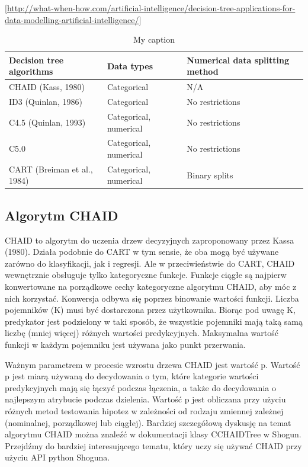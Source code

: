 \documentclass[10pt,a4paper]{article}
\begin{document}
[\url{http://what-when-how.com/artificial-intelligence/decision-tree-applications-for-data-modelling-artificial-intelligence/}]

\begin{table}[]
\centering
\caption{My caption}
\label{my-label}
\begin{tabular}{@{}lll@{}}
\toprule
\textbf{Decision tree algorithms} & \textbf{Data types}    & \textbf{Numerical data splitting method} \\ \midrule
CHAID (Kass, 1980)                & Categorical            & N/A                                      \\ \midrule
ID3 (Quinlan, 1986)               & Categorical            & No restrictions                          \\ \midrule
C4.5 (Quinlan, 1993)              & Categorical, numerical & No restrictions                          \\ \midrule
C5.0 			                  & Categorical, numerical & No restrictions                          \\ \midrule
CART (Breiman et al., 1984)       & Categorical, numerical & Binary splits                            \\ \bottomrule
\end{tabular}
\end{table}

\subsection{Algorytm CHAID}
CHAID to algorytm do uczenia drzew decyzyjnych zaproponowany przez Kassa (1980). Działa podobnie do CART w tym sensie, że oba mogą być używane zarówno do klasyfikacji, jak i regresji. Ale w przeciwieństwie do CART, CHAID wewnętrznie obsługuje tylko kategoryczne funkcje. Funkcje ciągłe są najpierw konwertowane na porządkowe cechy kategoryczne algorytmu CHAID, aby móc z nich korzystać. Konwersja odbywa się poprzez binowanie wartości funkcji. Liczba pojemników (K) musi być dostarczona przez użytkownika. Biorąc pod uwagę K, predykator jest podzielony w taki sposób, że wszystkie pojemniki mają taką samą liczbę (mniej więcej) różnych wartości predykcyjnych. Maksymalna wartość funkcji w każdym pojemniku jest używana jako punkt przerwania.

Ważnym parametrem w procesie wzrostu drzewa CHAID jest wartość p. Wartość p jest miarą używaną do decydowania o tym, które kategorie wartości predykcyjnych mają się łączyć podczas łączenia, a także do decydowania o najlepszym atrybucie podczas dzielenia. Wartość p jest obliczana przy użyciu różnych metod testowania hipotez w zależności od rodzaju zmiennej zależnej (nominalnej, porządkowej lub ciągłej). Bardziej szczegółową dyskusję na temat algorytmu CHAID można znaleźć w dokumentacji klasy CCHAIDTree w Shogun. Przejdźmy do bardziej interesującego tematu, który uczy się używać CHAID przy użyciu API python Shoguna.
\end{document}
